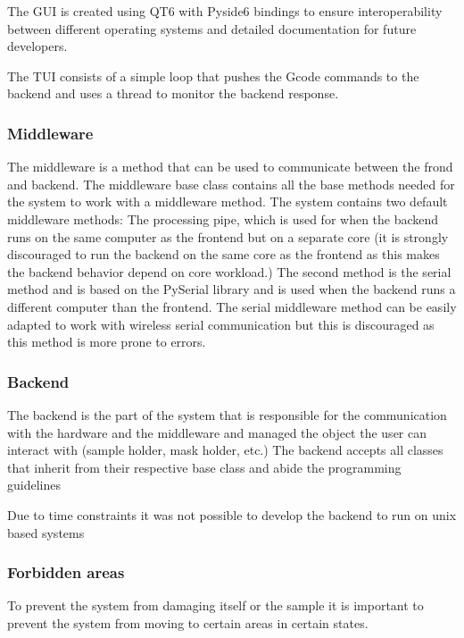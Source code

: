 \documentclass[10pt]{article}
\begin{document}
The GUI is created using QT6 with Pyside6 bindings  to ensure interoperability between different operating systems and detailed documentation for future developers.

The TUI consists of a simple loop that pushes the Gcode commands to the backend and uses a thread to monitor the backend response.

\subsubsection{Middleware}
The middleware is a method that can be used to communicate between the frond and backend. 
The middleware base class contains all the base methods needed for the system to work with a middleware method.
The system contains two default middleware methods: The processing pipe, which is used for when the backend runs on the same computer as the frontend but on a separate core (it is strongly discouraged to run the backend on the same core as the frontend as this makes the backend behavior depend on core workload.) 
The second method is the serial method and is based on the PySerial library  and is used when the backend runs a different computer than the frontend.
The serial middleware method can be easily adapted to work with wireless serial communication but this is discouraged as this method is more prone to errors.

\subsubsection{Backend}
The backend is the part of the system that is responsible for the communication with the hardware and the middleware and managed the object the user can interact with (sample holder, mask holder, etc.)
The backend accepts all classes that inherit from their respective base class and abide the programming guidelines 

Due to time constraints it was not possible to develop the backend to run on unix based systems



\subsubsection{Forbidden areas}
To prevent the system from damaging itself or the sample it is important to prevent the system from moving to certain areas in certain states.
\end{document}
